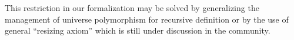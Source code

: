 %
This restriction in our formalization may be solved by
generalizing the management of universe polymorphism for recursive definition
%
or by the use of general ``resizing axiom'' which is still under
discussion in the community.


